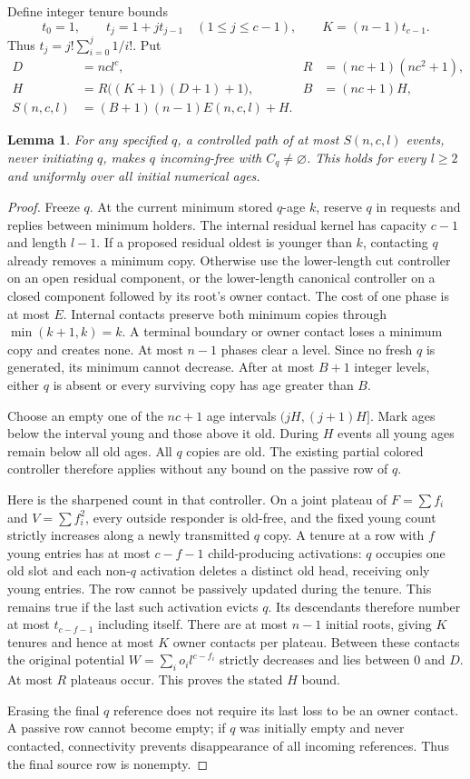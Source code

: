 \documentclass[11pt]{article}
\newtheorem{lemma}{Lemma}
\begin{document}
Define integer tenure bounds
\[
 t_0=1,\qquad t_j=1+j t_{j-1}\quad(1\le j\le c-1),\qquad
 K=(n-1)t_{c-1}.
\]
Thus $t_j=j!\sum_{i=0}^{j}1/i!$. Put
\begin{align*}
 D&=ncl^c,& R&=(nc+1)(nc^2+1),\\
 H&=R\bigl((K+1)(D+1)+1\bigr),& B&=(nc+1)H,\\
 S(n,c,l)&=(B+1)(n-1)E(n,c,l)+H.
\end{align*}
\begin{lemma}
For any specified $q$, a controlled path of at most $S(n,c,l)$ events,
never initiating $q$, makes $q$ incoming-free with $C_q\ne\varnothing$.
This holds for every $l\ge2$ and uniformly over all initial numerical ages.
\end{lemma}
\begin{proof}
Freeze $q$. At the current minimum stored $q$-age $k$, reserve $q$ in
requests and replies between minimum holders. The internal residual kernel
has capacity $c-1$ and length $l-1$. If a proposed residual oldest is younger
than $k$, contacting $q$ already removes a minimum copy. Otherwise use the
lower-length cut controller on an open residual component, or the
lower-length canonical controller on a closed component followed by its
root's owner contact. The cost of one phase is at most $E$.
Internal contacts preserve both minimum copies through $\min(k+1,k)=k$.
A terminal boundary or owner contact loses a minimum copy and creates none.
At most $n-1$ phases clear a level. Since no fresh $q$ is generated, its
minimum cannot decrease. After at most $B+1$ integer levels, either $q$ is
absent or every surviving copy has age greater than $B$.

Choose an empty one of the $nc+1$ age intervals $(jH,(j+1)H]$.
Mark ages below the interval young and those above it old. During $H$
events all young ages remain below all old ages. All $q$ copies are old.
The existing partial colored controller therefore applies without any
bound on the passive row of $q$.

Here is the sharpened count in that controller. On a joint plateau of
$F=\sum f_i$ and $V=\sum f_i^2$, every outside responder is old-free,
and the fixed young count strictly increases along a newly transmitted
$q$ copy. A tenure at a row with $f$ young entries has at most $c-f-1$
child-producing activations: $q$ occupies one old slot and each non-$q$
activation deletes a distinct old head, receiving only young entries.
The row cannot be passively updated during the tenure. This remains true
if the last such activation evicts $q$. Its descendants therefore number
at most $t_{c-f-1}$ including itself. There are at most $n-1$ initial
roots, giving $K$ tenures and hence at most $K$ owner contacts per plateau.
Between these contacts the original potential
$W=\sum_i o_i l^{c-f_i}$ strictly decreases and lies between $0$ and $D$.
At most $R$ plateaus occur. This proves the stated $H$ bound.

Erasing the final $q$ reference does not require its last loss to be an
owner contact. A passive row cannot become empty; if $q$ was initially
empty and never contacted, connectivity prevents disappearance of all
incoming references. Thus the final source row is nonempty.
\end{proof}
\end{document}
